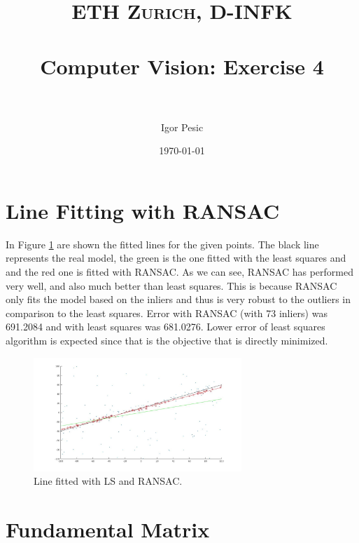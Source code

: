 \documentclass[paper=a4, fontsize=11pt]{scrartcl} %
\title{	
\normalfont \normalsize 
\textsc{ETH Zurich, D-INFK} \\ [25pt] %
\horrule{0.5pt} \\[0.4cm] %
\huge Computer Vision: Exercise 4 \\ %
\horrule{2pt} \\[0.5cm] %
}
\author{Igor Pesic} %
\date{\normalsize\today} %
\numberwithin{equation}{section} %
\numberwithin{figure}{section} %
\numberwithin{table}{section} %
\begin{document}
\maketitle %


\section{Line Fitting with RANSAC}

In Figure \ref{fig:ransacLine} are shown the fitted lines for the given points. The black line represents the real model, the green is the one fitted with the least squares and and the red one is fitted with RANSAC. As we can see, RANSAC has performed very well, and also much better than least squares. This is because RANSAC only fits the model based on the inliers and thus is very robust to the outliers in comparison to the least squares. Error with RANSAC (with 73 inliers) was 691.2084 and with least squares was 681.0276. Lower error of least squares algorithm is expected since that is the objective that is directly minimized.

\begin{figure}[h!]
\centering
\includegraphics[width=0.7\textwidth]{ransacLine.jpg}
\caption{Line fitted with LS and RANSAC.}
\label{fig:ransacLine}
\end{figure}


\section{Fundamental Matrix}
\end{document}
